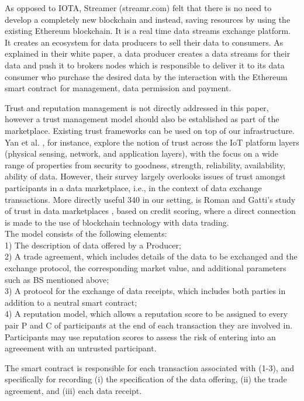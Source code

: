 \documentclass[12pt]{article}
\begin{document}
As opposed to IOTA, Streamer (streamr.com) felt that
there is no need to develop a completely new blockchain
and instead, saving resources by using the existing Ethereum
blockchain. It is a real time data streams exchange platform.
It creates an ecosystem for data producers to sell their data to
consumers. As explained in their white paper, a data producer
creates a data streams for their data and push it to brokers
nodes which is responsible to deliver it to its data consumer
who purchase the desired data by the interaction with the
Ethereum smart contract for management, data permission
and payment.\par
Trust and reputation management is not directly addressed
in this paper, however a trust management model should
also be established as part of the marketplace. Existing trust
frameworks can be used on top of our infrastructure. Yan et
al. , for instance, explore the notion of trust across the
IoT platform layers (physical sensing, network, and application layers), with the focus on a wide range of properties
from security to goodness, strength, reliability, availability,
ability of data. However, their survey largely overlooks issues
of trust amongst participants in a data marketplace, i.e., in the
context of data exchange transactions. More directly useful
340
in our setting, is Roman and Gatti’s study of trust in data
marketplaces , based on credit scoring, where a direct
connection is made to the use of blockchain technology with
data trading.
\\
The model consists of the following elements:\\
1) The description of data offered by a Producer;\\
2) A trade agreement, which includes details of the data
to be exchanged and the exchange protocol, the corresponding market value, and additional parameters such
as BS mentioned above;\\
3) A protocol for the exchange of data receipts, which
includes both parties in addition to a neutral smart
contract;\\
4) A reputation model, which allows a reputation score
to be assigned to every pair P and C of participants
at the end of each transaction they are involved in.
Participants may use reputation scores to assess the
risk of entering into an agreeement with an untrusted
participant.
\par
The smart contract is responsible for each transaction
associated with (1-3), and specifically for recording (i) the
specification of the data offering, (ii) the trade agreement,
and (iii) each data receipt.
\end{document}
